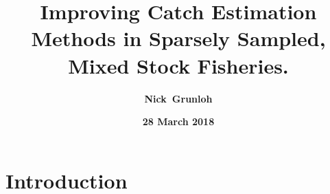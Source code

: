 \documentclass[ xcolor = pdftex, dvipsnames, table ]{beamer}
\begin{document}
%

\title{\textbf{Improving Catch Estimation Methods in Sparsely Sampled, Mixed Stock Fisheries.}}

\author{
\textbf{\mbox{Nick Grunloh}}
}




\date{
\textbf{28 March 2018}
}

%
%

%
\section{Introduction}
\subsection{}
\begin{frame}
	\maketitle
\end{frame}

%
%

%
\end{document}
